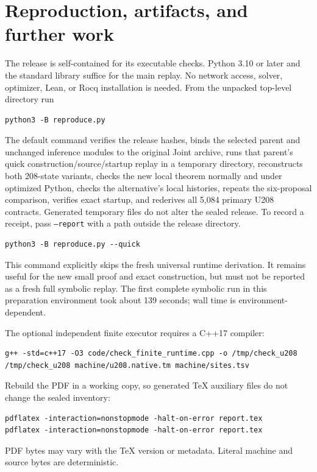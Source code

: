 \section{Reproduction, artifacts, and further work}
The release is self-contained for its executable checks. Python 3.10 or
later and the standard library suffice for the main replay. No network
access, solver, optimizer, Lean, or Rocq installation is needed.
From the unpacked top-level directory run
\begin{verbatim}
python3 -B reproduce.py
\end{verbatim}
The default command verifies the release hashes, binds the selected
parent and unchanged inference modules to the original Joint archive,
runs that parent's quick construction/source/startup replay in a temporary
directory, reconstructs both 208-state variants, checks the new local
theorem normally and under optimized Python, checks the alternative's
local histories, repeats the six-proposal comparison, verifies exact
startup, and rederives all 5,084 primary U208 contracts. Generated
temporary files do not alter the sealed release. To record a receipt,
pass \texttt{--report} with a path outside the release directory.

\begin{verbatim}
python3 -B reproduce.py --quick
\end{verbatim}
This command explicitly skips the fresh universal runtime derivation.
It remains useful for the new small proof and exact construction, but
must not be reported as a fresh full symbolic replay. The first complete
symbolic run in this preparation environment took about 139 seconds;
wall time is environment-dependent.

The optional independent finite executor requires a C++17 compiler:
\begin{verbatim}
g++ -std=c++17 -O3 code/check_finite_runtime.cpp -o /tmp/check_u208
/tmp/check_u208 machine/u208.native.tm machine/sites.tsv
\end{verbatim}
Rebuild the PDF in a working copy, so generated TeX auxiliary files do not
change the sealed inventory:
\begin{verbatim}
pdflatex -interaction=nonstopmode -halt-on-error report.tex
pdflatex -interaction=nonstopmode -halt-on-error report.tex
\end{verbatim}
PDF bytes may vary with the TeX version or metadata. Literal machine
and source bytes are deterministic.

